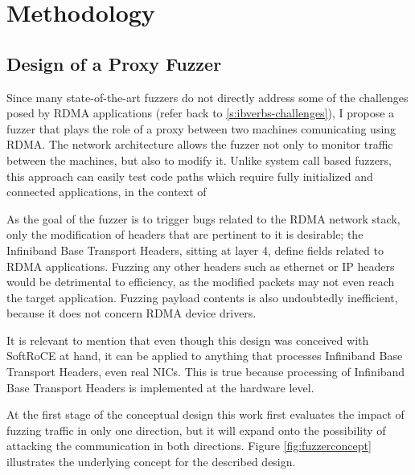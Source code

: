 \section{Methodology}

\subsection{Design of a Proxy Fuzzer}

Since many state-of-the-art fuzzers do not directly address some of the challenges
posed by RDMA applications (refer back to \ref{s:ibverbs-challenges}), I propose a fuzzer that plays the role
of a proxy between two machines comunicating using RDMA. The network architecture
allows the fuzzer not only to monitor traffic between the machines, but also to modify it.
Unlike system call based fuzzers, this approach can easily test code paths which require
fully initialized and connected applications, in the context of %


As the goal of the fuzzer is to trigger bugs related to the RDMA network stack,
only the modification of headers that are pertinent to it is desirable;
the Infiniband Base Transport Headers, sitting at layer 4,
define fields related to RDMA applications. Fuzzing any other headers such as
ethernet or IP headers would be detrimental to efficiency, as the modified packets may
not even reach the target application. Fuzzing payload contents is also undoubtedly inefficient,
because it does not concern RDMA device drivers.


It is relevant to mention that even though this design was conceived with
SoftRoCE at hand, it can be applied to anything that processes Infiniband Base
Transport Headers, even real NICs. This is true because processing of Infiniband
Base Transport Headers is implemented at the hardware level.




At the first stage of the conceptual design this work first evaluates the impact of fuzzing
traffic in only one direction, but it will expand onto the possibility of attacking the
communication in both directions. Figure \ref{fig:fuzzerconcept} illustrates the underlying
concept for the described design.

